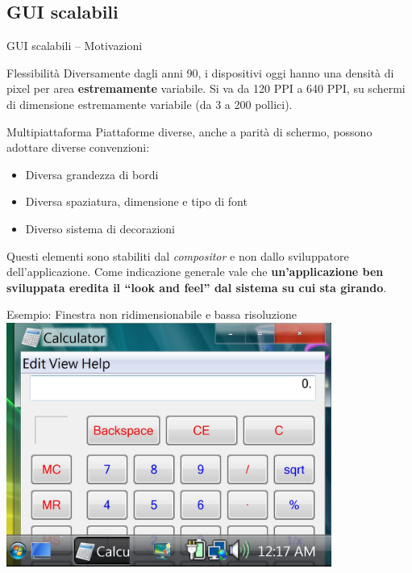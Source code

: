 \documentclass[presentation]{beamer}
\begin{document}
\subsection{GUI scalabili}

\begin{frame}{GUI scalabili -- Motivazioni}
\begin{block}{Flessibilità}
Diversamente dagli anni 90, i dispositivi oggi hanno una densità di pixel per area \textbf{estremamente} variabile. Si va da 120 PPI a 640 PPI, su schermi di dimensione estremamente variabile (da 3 a 200 pollici).
\end{block}

\begin{block}{Multipiattaforma}
Piattaforme diverse, anche a parità di schermo, possono adottare diverse convenzioni:
\begin{itemize}
\item Diversa grandezza di bordi
\item Diversa spaziatura, dimensione e tipo di font
\item Diverso sistema di decorazioni
\end{itemize}

Questi elementi sono stabiliti dal \emph{compositor} e non dallo sviluppatore dell'applicazione. Come indicazione generale vale che \textbf{un'applicazione ben sviluppata eredita il ``look and feel'' dal sistema su cui sta girando}.
\end{block}
\end{frame}

\begin{frame}{Esempio: Finestra non ridimensionabile e bassa risoluzione}
\centering
\includegraphics[width=0.8\textwidth]{img/lowres}
\end{frame}
\end{document}
